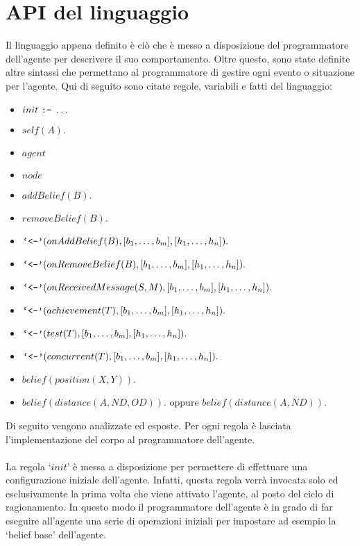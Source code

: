 \section{API del linguaggio}
Il linguaggio appena definito è ciò che è messo a disposizione del programmatore dell'agente per descrivere il suo comportamento. Oltre questo, sono state definite altre sintassi che permettano al programmatore di gestire ogni evento o situazione per l'agente.
Qui di seguito sono citate regole, variabili e fatti del linguaggio:
\begin{itemize}
\item $init \ \text{\texttt{:-}}\  \ldots$
\item $self(A).$
\item $agent$
\item $node$
\item $addBelief(B).$
\item $removeBelief(B).$
\item $\text{\text{\texttt{`<-'}}}(onAddBelief(B), [b_1, \ldots, b_m], [h_1, \ldots, h_n]).$
\item $\text{\text{\texttt{`<-'}}}(onRemoveBelief(B), [b_1, \ldots, b_m], [h_1, \ldots, h_n]).$
\item $\text{\text{\texttt{`<-'}}}(onReceivedMessage(S,M), [b_1, \ldots, b_m], [h_1, \ldots, h_n]).$
\item $\text{\text{\texttt{`<-'}}}(achievement(T), [b_1, \ldots, b_m], [h_1, \ldots, h_n]).$
\item $\text{\text{\texttt{`<-'}}}(test(T), [b_1, \ldots, b_m], [h_1, \ldots, h_n]).$
\item $\text{\text{\texttt{`<-'}}}(concurrent(T), [b_1, \ldots, b_m], [h_1, \ldots, h_n]).$
\item $belief(position(X,Y)).$
\item $belief(distance(A, ND, OD)).$ oppure $belief(distance(A, ND)).$
\end{itemize}

Di seguito vengono analizzate ed esposte.
Per ogni regola è lasciata l'implementazione del corpo al programmatore dell'agente.

\paragraph*{}
La regola `$init$' è messa a disposizione per permettere di effettuare una configurazione iniziale dell'agente. Infatti, questa regola verrà invocata solo ed esclusivamente la prima volta che viene attivato l'agente, al posto del ciclo di ragionamento. In questo modo il programmatore dell'agente è in grado di far eseguire all'agente una serie di operazioni iniziali per impostare ad esempio la `belief base' dell'agente.

